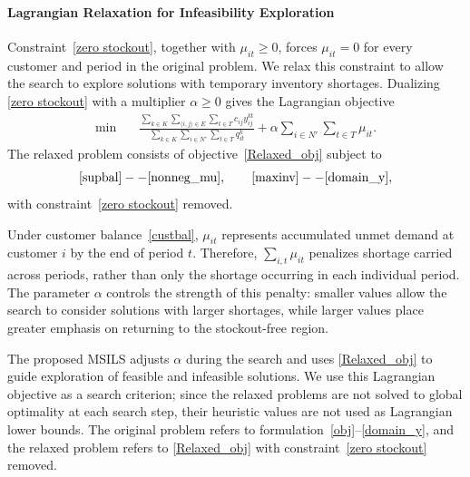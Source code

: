 \documentclass{article}
\begin{document}
\paragraph{Lagrangian Relaxation for Infeasibility Exploration}
\label{sec:lagrangian_relaxation}

Constraint~\eqref{zero stockout}, together with
$\mu_{it}\geq0$, forces $\mu_{it}=0$ for every customer and period in the
original problem. We relax this constraint to allow the search to explore
solutions with temporary inventory shortages. Dualizing
\eqref{zero stockout} with a multiplier $\alpha\geq0$ gives the
Lagrangian objective
\begin{align}
\min \quad &
\frac{
\displaystyle
\sum_{k\in K}
\sum_{\langle i,j\rangle\in E}
\sum_{t\in T}
c_{ij}y_{ij}^{kt}
}{
\displaystyle
\sum_{k\in K}
\sum_{i\in N'}
\sum_{t\in T}
q_{it}^{k}
}
+
\alpha
\sum_{i\in N'}
\sum_{t\in T}
\mu_{it}.
\label{Relaxed_obj}
\end{align}
The relaxed problem consists of objective~\eqref{Relaxed_obj} subject to
\[
\eqref{supbal}--\eqref{nonneg_mu},
\qquad
\eqref{maxinv}--\eqref{domain_y},
\]
with constraint~\eqref{zero stockout} removed.

Under customer balance~\eqref{custbal}, $\mu_{it}$ represents accumulated
unmet demand at customer $i$ by the end of period $t$. Therefore,
$\sum_{i,t}\mu_{it}$ penalizes shortage carried across periods, rather than
only the shortage occurring in each individual period. The parameter
$\alpha$ controls the strength of this penalty: smaller values allow the
search to consider solutions with larger shortages, while larger values
place greater emphasis on returning to the stockout-free region.


The proposed MSILS adjusts $\alpha$ during the search and uses
\eqref{Relaxed_obj} to guide exploration of feasible and infeasible
solutions. We use this Lagrangian objective as a search criterion; since
the relaxed problems are not solved to global optimality at each search
step, their heuristic values are not used as Lagrangian lower bounds.
The original problem refers to formulation~\eqref{obj}--\eqref{domain_y},
and the relaxed problem refers to \eqref{Relaxed_obj} with
constraint~\eqref{zero stockout} removed.
\end{document}
